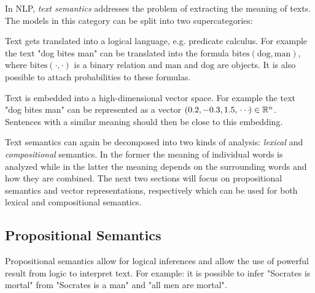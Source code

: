 		In NLP, \emph{text semantics} addresses the problem of extracting the meaning of texts. The models in this category can be split into two supercategories:
		\begin{description}[leftmargin = 5cm]
			\item[Propositional Semantics]
				Text gets translated into a logical language, e.g. predicate calculus. For example the text "dog bites man" can be translated into the formula \( \mathrm{bites}(\mathrm{dog}, \mathrm{man}) \), where \( \mathrm{bites}(\cdot, \cdot) \) is a binary relation and \(\mathrm{man}\) and \(\mathrm{dog}\) are objects. It is also possible to attach probabilities to these formulas.
			\item[Vector Representation]
				Text is embedded into a high-dimensional vector space. For example the text "dog bites man" can be represented as a vector \( (0.2, -0.3, 1.5, \,\cdots\!) \in \mathbb{R}^n \). Sentences with a similar meaning should then be close to this embedding.
		\end{description}
		Text semantics can again be decomposed into two kinds of analysis: \emph{lexical} and \emph{compositional} semantics. In the former the meaning of individual words is analyzed while in the latter the meaning depends on the surrounding words and how they are combined. The next two sections will focus on propositional semantics and vector representations, respectively which can be used for both lexical and compositional semantics.

		\subsection{Propositional Semantics}
			Propositional semantics allow for logical inferences and allow the use of powerful result from logic to interpret text. For example: it is possible to infer "Socrates is mortal" from "Socrates is a man" and "all men are mortal".


